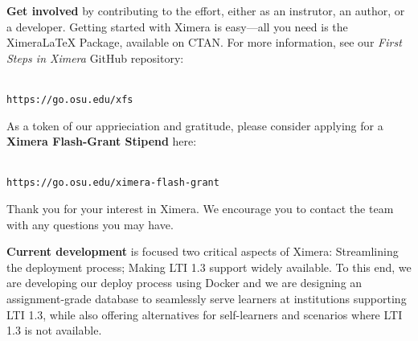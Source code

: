 \documentclass[twocolumn]{article}
\begin{document}
\begin{xframe}
    {\sffamily\bfseries Get involved} by contributing to the effort,
    either as an instrutor, an author, or a developer. Getting started with
    Ximera is
    easy---all you need is the XimeraLaTeX Package, available on CTAN. For more
    information, see our \textit{First Steps in Ximera} GitHub repository:
    \begin{center}
        \\
        \small\tt  https://go.osu.edu/xfs
    \end{center}
    As a token of our apprieciation and gratitude, please  consider applying for a \textbf{Ximera Flash-Grant Stipend} here:
    \begin{center}
        \\
        \small\tt  https://go.osu.edu/ximera-flash-grant
    \end{center}
    Thank you for your interest in Ximera. We encourage you to contact the team
    with  any questions you may have.
\end{xframe}

\begin{xframe}
    {\sffamily\bfseries Current development} is focused two critical
    aspects of Ximera: Streamlining the deployment
    process; Making LTI 1.3 support widely available.
    To this end, we are
    developing our
    deploy process using Docker and we are designing an assignment-grade
    database to
    seamlessly serve  learners at institutions supporting LTI 1.3, while also
    offering alternatives for self-learners and scenarios where
    LTI 1.3 is not available.
    \begin{center}
    \end{center}

\end{xframe}
\end{document}

